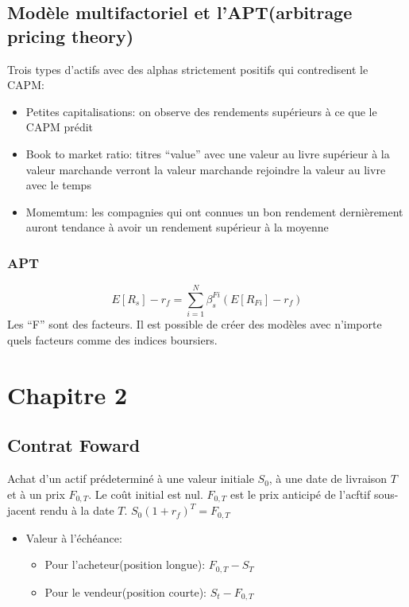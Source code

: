 \documentclass[]{book}
\providecommand{\tightlist}{%
  \setlength{\itemsep}{0pt}\setlength{\parskip}{0pt}}
\theoremstyle{definition}
\theoremstyle{definition}
\theoremstyle{definition}
\theoremstyle{remark}
\begin{document}
\subsection{Modèle multifactoriel et l'APT(arbitrage pricing
theory)}\label{modele-multifactoriel-et-laptarbitrage-pricing-theory}

Trois types d'actifs avec des alphas strictement positifs qui
contredisent le CAPM:

\begin{itemize}
\tightlist
\item
  Petites capitalisations: on observe des rendements supérieurs à ce que
  le CAPM prédit
\item
  Book to market ratio: titres ``value'' avec une valeur au livre
  supérieur à la valeur marchande verront la valeur marchande rejoindre
  la valeur au livre avec le temps
\item
  Momemtum: les compagnies qui ont connues un bon rendement dernièrement
  auront tendance à avoir un rendement supérieur à la moyenne
\end{itemize}

\subsubsection{APT}\label{apt}

\[
E[R_s]-r_f= \sum_{i=1}^N \beta_s^{Fi}(E[R_{Fi}]-r_f)
\] Les ``F'' sont des facteurs. Il est possible de créer des modèles
avec n'importe quels facteurs comme des indices boursiers.

\section{Chapitre 2}\label{chapitre-2}

\subsection{Contrat Foward}\label{contrat-foward}

Achat d'un actif prédeterminé à une valeur initiale \(S_0\), à une date
de livraison \(T\) et à un prix \(F_{0,T}\). Le coût initial est nul.
\(F_{0,T}\) est le prix anticipé de l'acftif sous-jacent rendu à la date
\(T\). \(S_0(1+r_f)^T=F_{0,T}\)

\begin{itemize}
\tightlist
\item
  Valeur à l'échéance:

  \begin{itemize}
  \tightlist
  \item
    Pour l'acheteur(position longue): \(F_{0,T} - S_T\)
  \item
    Pour le vendeur(position courte): \(S_t - F_{0,T}\)
  \end{itemize}
\end{itemize}
\end{document}
